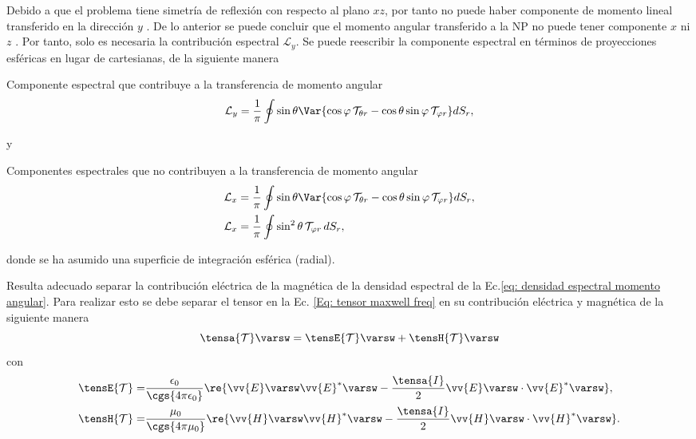 Debido a que el problema tiene simetría de reflexión con respecto al plano $xz$, por tanto no puede haber componente de momento lineal transferido en la dirección $y$ \cite{PRBCoronado}. De lo anterior se puede concluir que el momento angular transferido a la NP no puede tener componente $x$ ni $z$ \cite{castellanos2021phdthesis}. Por tanto, solo es necesaria la contribución espectral $\mathcal{L}_y$. Se puede reescribir la componente espectral en términos de proyecciones esféricas en lugar de cartesianas, de la siguiente manera\cite{castellanos2021phdthesis}
%
\begin{mybox}{\centering  Componente espectral que contribuye a la transferencia de momento angular}
\begin{equation}
\mathcal{L}_y = \frac{1}{\pi}\oint \sin\theta \Var{\cos\varphi \,\mathcal{T}_{\theta r} - \cos\theta\sin\varphi\,\mathcal{T}_{\varphi r}} dS_r,
\label{eq: Ly spectral density r theta}
\end{equation}
\end{mybox}	
% 
y
%
\begin{mybox}{\centering  Componentes espectrales que no contribuyen a la transferencia de momento angular}
\begin{align}
\mathcal{L}_x &= \frac{1}{\pi}\oint \sin\theta \Var{\cos\varphi \,\mathcal{T}_{\theta r} - \cos\theta\sin\varphi\,\mathcal{T}_{\varphi r}} dS_r,
\label{eq: Lx spectral density r theta} \\
\mathcal{L}_x &= \frac{1}{\pi}\oint \sin^2\theta \, \mathcal{T}_{\varphi r} \, dS_r,
\label{eq: Lz spectral density r theta}
\end{align}
\end{mybox}	
% 
donde se ha asumido una superficie de integración esférica (radial).

Resulta adecuado separar la contribución eléctrica de la magnética de la densidad espectral de la Ec.\eqref{eq: densidad espectral momento angular}. Para realizar esto se debe separar el tensor en la Ec. \eqref{Eq: tensor maxwell freq} en su contribución eléctrica y magnética de la siguiente manera
\begin{equation}
\tensa{\mathcal{T}}\varsw = \tensE{\mathcal{T}}\varsw +\tensH{\mathcal{T}}\varsw 
\end{equation}
con 
\begin{align}
\tensE{\mathcal{T}}=& \frac{\epsilon_0}{\cgs{4\pi\epsilon_0}} \re{\vv{E}\varsw \vv{E}^{*}\varsw - \frac{\tensa{I}}{2} \vv{E}\varsw\cdot\vv{E}^{*}\varsw},\\
\tensH{\mathcal{T}}=& \frac{\mu_0}{\cgs{4\pi\mu_0}} \re{\vv{H}\varsw \vv{H}^{*}\varsw - \frac{\tensa{I}}{2} \vv{H}\varsw\cdot\vv{H}^{*}\varsw}.
\end{align}

